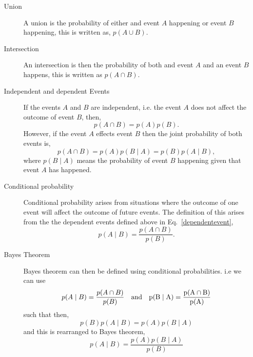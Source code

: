 \begin{description}
\item [Union]
A union is the probability of either and event $A$ happening or event $B$ happening, this is written as, $p(A \cup B)$.

\item [Intersection]
An intersection is then the probability of both and event $A$ and an event $B$ happens, this is written as $p(A \cap B)$.

\item [Independent and dependent Events]
If the events $A$ and $B$ are independent, i.e. the event $A$ does not affect the outcome of event $B$, then,
\begin{equation}
p(A \cap B) = p(A)p(B).
\end{equation}
However, if the event $A$ effects event $B$ then the joint probability of both events is,
\begin{equation}
\label{dependentevent}
p(A \cap B) = p(A)p(B \mid A) = p(B)p(A \mid B),
\end{equation}
where $p(B \mid A)$ means the probability of event $B$ happening given that event $A$ has happened.

\item [Conditional probability]
Conditional probability arises from situations where the outcome of one event will affect the outcome of future events.
The definition of this arises from the the dependent events defined above in Eq.~\ref{dependentevent},
\begin{equation}
p(A \mid B) = \frac{p(A \cap B)}{p(B)}.
\end{equation}

\item [Bayes Theorem]
Bayes theorem can then be defined using conditional probabilities. i.e we can use
\begin{equation}
p(A \mid B) = \frac{p(A \cap B)}{p(B)} \quad \rm{and} \quad p(B \mid A) = \frac{p(A \cap B)}{p(A)}
\end{equation}
such that then,
\begin{equation}
p(B)p(A \mid B) = p(A)p(B \mid A)
\end{equation}
and this is rearranged to Bayes theorem,
\begin{equation}
p(A \mid B) = \frac{p(A)p(B \mid A)}{p(B)}
\end{equation}

\end{description}

